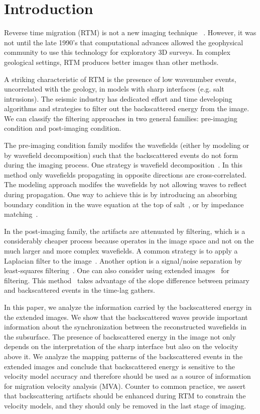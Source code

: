 \section{Introduction}

Reverse time migration (RTM) is not a new imaging technique ~\citep{baysal:1514, whitmore:382, GPR:GPR413}.
However, it was not until the late 1990’s that computational
 advances allowed the geophysical community to use this technology for exploratory
3D surveys. In complex geological settings, RTM produces better 
images than other methods. 

A striking characteristic of RTM is the presence of low wavenumber events, uncorrelated with
the geology, in models
with sharp interfaces (e.g. salt intrusions). The seismic industry has dedicated effort and time developing algorithms and strategies
to filter out the backscattered energy from the image. We can classify the filtering
 approaches in two general families: pre-imaging condition and post-imaging condition. 

The pre-imaging condition family modifes the wavefields (either by modeling or by wavefield decomposition)
 such that the backscattered events do not form during the imaging process.
One strategy is wavefield decomposition~\citep[]{liu:S29,fei:3130}. In this method only 
 wavefields propagating in opposite directions are cross-correlated. The modeling approach modifes the wavefields by not
allowing waves to reflect during propagation. One way to achieve this is by introducing an absorbing
boundary condition in the wave equation at the top of salt~\citep{fletcher:2049}, or 
by impedance matching~\citep{baysal:132}. 


In the post-imaging family, the artifacts are attenuated by filtering, which is a 
 considerably cheaper process because operates in the image space and not on the much larger and more complex wavefields. A common
strategy is to apply a Laplacian filter to the image~\citep{youn:246}. Another option
is a signal/noise separation by least-squares filtering~\citep{guitton:S19}. One can also consider using
extended images~\citep{rickett:883,sava:S209,GPR:GPR888} for filtering. This method~\citep{kaelin:3125}
 takes advantage of the slope difference between primary and 
backscattered events in the time-lag gathers.

In this paper, we analyze the information carried by the backscattered energy in the extended
 images. We show that the backscattered waves provide important information about the 
synchronization between the reconstructed wavefields in the subsurface.
 The presence of backscattered energy in the image not only depends on the interpretation
of the sharp interface but also on the velocity above it. We analyze the mapping patterns of the backscattered
events in the extended images and conclude that backscattered energy
is sensitive to the velocity model accuracy and therefore should be used as a source
of information for migration velocity analysis (MVA). Counter to common practice, we assert that
backscattering artifacts should be enhanced during RTM to constrain the velocity models,
and they should only be removed in the last stage of imaging.



